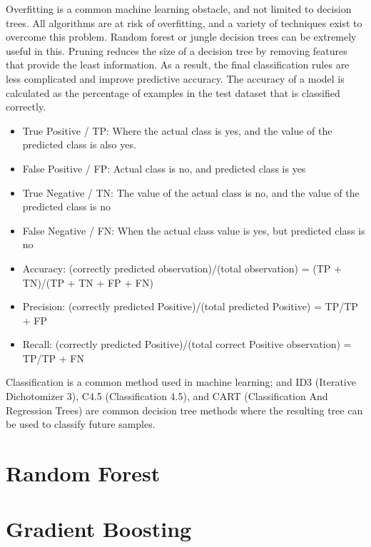 \documentclass[12pt]{article}
\begin{document}
Overfitting is a common machine learning obstacle, and not limited to decision trees. All algorithms are at risk of overfitting, and a variety of techniques exist to overcome this problem. Random forest or jungle decision trees can be extremely useful in this. Pruning reduces the size of a decision tree by removing features that provide the least information. As a result, the final classification rules are
less complicated and improve predictive accuracy. The accuracy of a model is calculated as the percentage of examples in
the test dataset that is classified correctly.

\begin{itemize}

\item{True Positive / TP: Where the actual class is yes, and
the value of the predicted class is also yes.}

\item{False Positive / FP: Actual class is no, and predicted
class is yes}

\item{True Negative / TN: The value of the actual class is no,
and the value of the predicted class is no}

\item{False Negative / FN: When the actual class value is yes,
but predicted class is no}

\item{Accuracy: (correctly predicted observation)/(total
observation) = (TP + TN)/(TP + TN + FP + FN)}

\item{Precision: (correctly predicted Positive)/(total
predicted Positive) = TP/TP + FP}

\item{Recall: (correctly predicted Positive)/(total correct
Positive observation) = TP/TP + FN}

\end{itemize}

Classification is a common method used in machine learning; and ID3 (Iterative Dichotomizer 3), C4.5 (Classification 4.5), and CART
(Classification And Regression Trees) are common decision tree methods where the resulting tree can be used to classify future samples.
\newpage
\section{Random Forest}

\newpage
\section{Gradient Boosting}
\end{document}
